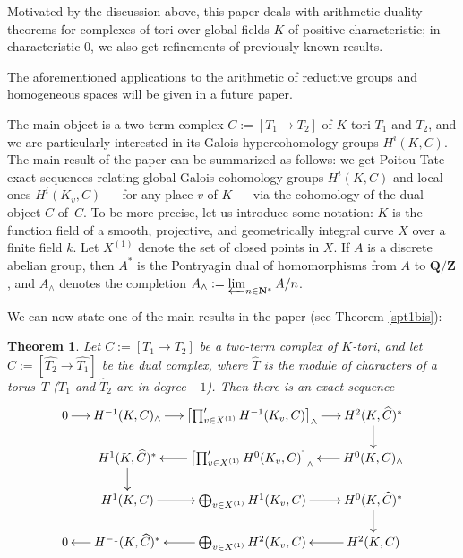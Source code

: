 \documentclass[11pt]{article}
\theoremstyle{plain}
\newtheorem*{theo*}{Theorem}
\theoremstyle{definition}
\newcommand \ZZ {\mathbf{Z}}
\newcommand \QQ {\mathbf{Q}}
\newcommand \NN {\mathbf{N}}
\begin{document}
Motivated by the discussion above, this paper deals with arithmetic duality theorems for complexes of tori over global fields $K$
of positive characteristic;
in characteristic $0$, we also get refinements of previously known results.

The aforementioned applications to the arithmetic of reductive groups and homogeneous spaces will be given in a future paper.\enlargethispage{-\baselineskip}%

The main object is a two-term complex $C:= [T_1 \to T_2]$ of $K$-tori $T_1$ and $T_2$, and we are particularly interested in its Galois hypercohomology groups $H^i(K, C)$. The main result of the paper can be summarized as follows: we get Poitou-Tate exact sequences relating global Galois cohomology groups $H^i(K,C)$ and local ones $H^i(K_v,C)$ --- for any place $v$ of $K$ --- via the cohomology of the dual object $\widehat{C}$ of~$C$. To be more precise, let us introduce some notation: $K$ is the function field of a smooth, projective, and geometrically
integral curve $X$ over a finite field $k$. Let $X^{(1)}$ denote the set of closed points in $X$. If $A$ is a discrete
abelian group,
then $A^*$ is the Pontryagin dual of homomorphisms from $A$ to $\QQ / \ZZ$, and $A_\wedge$ denotes the completion $A_{\wedge}:=\varprojlim_{n \in \NN^*} A/n$.

\pagebreak[2]
We can now state one of the main results in the paper (see Theorem \ref{spt1bis}):

\begin{theo*}
Let $C:= [T_1 \to T_2]$ be a two-term complex of $K$-tori, and let \hbox{$\widehat{C}:= [\widehat{T_2} \to \widehat{T_1}]$} be the dual complex, where $\widehat{T}$ is the module of characters of a torus~$T$ ($T_1$ and $\widehat{T}_2$ are in degree $-1$). Then there is an exact sequence
\begin{equation}
\begin{array}{c}
\xymatrix@=5mm{
0 \ar[r]& H^{-1}(K,C)_{\wedge} \ar[r]& \bigl[\prod^{\prime}_{v \in X^{(1)}}
H^{-1}(K_v,C)\bigr]_{\wedge} \ar[r]&
H^2(K,\widehat C)^*\ar[d]\\
& H^1(K,\widehat C)^*\ar[d] &\ar[l]\bigl[\prod^{\prime}_{v \in X^{(1)}} H^{0}(K_v,C)\bigr]_{\wedge}&
\ar[l]H^0(K,C)_{\wedge}\\
& H^1(K,C) \ar[r]& \bigoplus_{v \in X^{(1)}} H^1(K_v,C) \ar[r]& H^0(K,\widehat C)^*\ar[d]\\
0 &\ar[l]H^{-1}(K,\widehat C)^*& \ar[l]\bigoplus_{v \in X^{(1)}} H^2(K_v,C)&\ar[l]H^2(K,C)
}
\end{array}
\end{equation}
\end{theo*}
\end{document}

